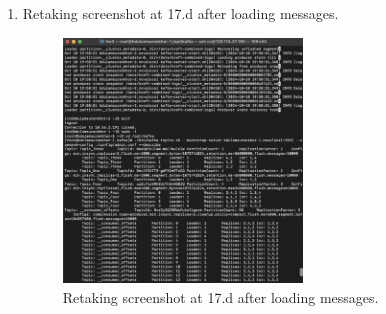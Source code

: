 \documentclass{article}
\begin{document}
\begin{enumerate}
\begin{enumerate}
    \item Retaking screenshot at 17.d after loading messages.
    \begin{figure}[H]
      \centering
      \includegraphics[width=0.6\textwidth]{image9.png}
      \caption{Retaking screenshot at 17.d after loading messages.}
    \end{figure}
  \end{enumerate}
\end{enumerate}
\end{document}
